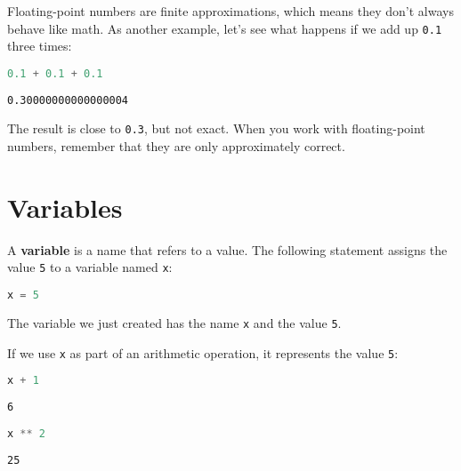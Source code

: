 \pagebreak

Floating-point numbers are finite approximations, which means they don't
always behave like math. As another example, let's see what happens if
we add up \passthrough{\lstinline!0.1!} three times:

\begin{lstlisting}[language=Python,style=source]
0.1 + 0.1 + 0.1
\end{lstlisting}

\begin{lstlisting}[style=output]
0.30000000000000004
\end{lstlisting}

The result is close to \passthrough{\lstinline!0.3!}, but not exact.
When you work with floating-point numbers, remember that they are only
approximately correct.

\section{Variables}\label{variables}

A \textbf{variable} is a name that refers to a value. The following
statement assigns the value \passthrough{\lstinline!5!} to a variable
named \passthrough{\lstinline!x!}:

\begin{lstlisting}[language=Python,style=source]
x = 5
\end{lstlisting}

The variable we just created has the name \passthrough{\lstinline!x!}
and the value \passthrough{\lstinline!5!}.

If we use \passthrough{\lstinline!x!} as part of an arithmetic
operation, it represents the value \passthrough{\lstinline!5!}:

\begin{lstlisting}[language=Python,style=source]
x + 1
\end{lstlisting}

\begin{lstlisting}[style=output]
6
\end{lstlisting}

\begin{lstlisting}[language=Python,style=source]
x ** 2
\end{lstlisting}

\begin{lstlisting}[style=output]
25
\end{lstlisting}

